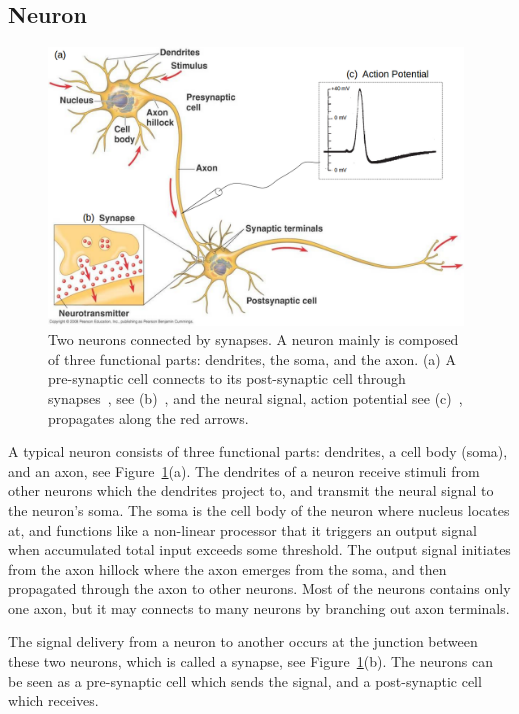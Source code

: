 \subsection{Neuron}
	\begin{figure}[bt]
	\centering
	\includegraphics[width=0.98\textwidth]{pics_snn/neuron2.png}
	\caption{Two neurons connected by synapses. 
		A neuron mainly is composed of three functional parts: dendrites, the soma, and the axon. (a) A pre-synaptic cell connects to its post-synaptic cell through synapses~\cite{reece2011campbell}, see (b)~\cite{reece2011campbell}, and the neural signal, action potential see (c)~\cite{hodgkin1939action}, propagates along the red arrows. }
	\label{Fig:neuron_basic}
\end{figure}
A typical neuron consists of three functional parts: dendrites, a cell body (soma), and an axon, see Figure~\ref{Fig:neuron_basic}(a).
The dendrites of a neuron receive stimuli from other neurons which the dendrites project to, and transmit the neural signal to the neuron's soma.
The soma is the cell body of the neuron where nucleus locates at, and functions like a non-linear processor that it triggers an output signal when accumulated total input exceeds some threshold.
The output signal initiates from the axon hillock where the axon emerges from the soma, and then propagated through the axon to other neurons.
Most of the neurons contains only one axon, but it may connects to many neurons by branching out axon terminals. 


The signal delivery from a neuron to another occurs at the junction between these two neurons, which is called a synapse, see Figure~\ref{Fig:neuron_basic}(b).
The neurons can be seen as a pre-synaptic cell which sends the signal, and a post-synaptic cell which receives.

